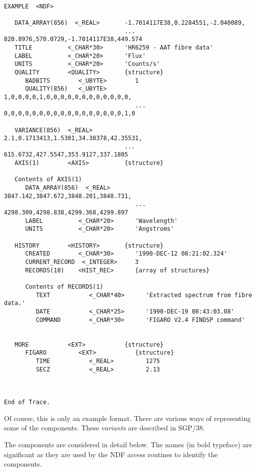 \documentclass[twoside,11pt]{article}
\renewcommand{\_}{{\tt\char'137}}
\newcommand{\xref}[3]{#1}
\begin{document}
\begin{verbatim}

EXAMPLE  <NDF>

   DATA_ARRAY(856)  <_REAL>       -1.7014117E38,0.2284551,-2.040089,
                                  ... 820.8976,570.0729,-1.7014117E38,449.574
   TITLE          <_CHAR*30>      'HR6259 - AAT fibre data'
   LABEL          <_CHAR*20>      'Flux'
   UNITS          <_CHAR*20>      'Counts/s'
   QUALITY        <QUALITY>       {structure}
      BADBITS        <_UBYTE>        1
      QUALITY(856)   <_UBYTE>        1,0,0,0,0,1,0,0,0,0,0,0,0,0,0,0,0,0,
                                     ... 0,0,0,0,0,0,0,0,0,0,0,0,0,0,0,0,0,1,0

   VARIANCE(856)  <_REAL>         2.1,0.1713413,1.5301,34.38378,42.35531,
                                  ... 615.6732,427.5547,353.9127,337.1805
   AXIS(1)        <AXIS>          {structure}

   Contents of AXIS(1)
      DATA_ARRAY(856)  <_REAL>       3847.142,3847.672,3848.201,3848.731,
                                     ... 4298.309,4298.838,4299.368,4299.897
      LABEL          <_CHAR*20>      'Wavelength'
      UNITS          <_CHAR*20>      'Angstroms'

   HISTORY        <HISTORY>       {structure}
      CREATED        <_CHAR*30>      '1990-DEC-12 08:21:02.324'
      CURRENT_RECORD  <_INTEGER>     3
      RECORDS(10)    <HIST_REC>      {array of structures}

      Contents of RECORDS(1)
         TEXT           <_CHAR*40>      'Extracted spectrum from fibre data.'
         DATE           <_CHAR*25>      '1990-DEC-19 08:43:03.08'
         COMMAND        <_CHAR*30>      'FIGARO V2.4 FINDSP command'


   MORE           <EXT>           {structure}
      FIGARO         <EXT>           {structure}
         TIME           <_REAL>         1275
         SECZ           <_REAL>         2.13



End of Trace.
\end{verbatim}
\newpage

Of course, this is only an example format. There are various ways of
representing some of the components.
These {\sl variants\/} are described in \xref{SGP/38}{sgp38}{}.

The components are considered in detail below.
The names (in bold typeface) are significant as they are used by the NDF
access routines to identify the components.
\end{document}
